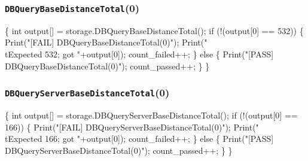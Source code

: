 \documentclass{article}
\def\nwendcode{\endtrivlist \endgroup}
\let\nwdocspar=\par
\begin{document}
\subsubsection{{\tt{}DBQueryBaseDistanceTotal}(0)}
\nwenddocs{}\endmoddef{}
\{
  int output[] = storage.DBQueryBaseDistanceTotal();
  if (!(output[0] == 532)) \{
    Print("[FAIL] DBQueryBaseDistanceTotal(0)");
    Print("\\tExpected 532; got "+output[0]);
    count_failed++;
  \} else \{
    Print("[PASS] DBQueryBaseDistanceTotal(0)");
    count_passed++;
  \}
\}
\nwendcode{}\nwdocspar
\subsubsection{{\tt{}DBQueryServerBaseDistanceTotal}(0)}
\nwenddocs{}\endmoddef{}
\{
  int output[] = storage.DBQueryServerBaseDistanceTotal();
  if (!(output[0] == 166)) \{
    Print("[FAIL] DBQueryServerBaseDistanceTotal(0)");
    Print("\\tExpected 166; got "+output[0]);
    count_failed++;
  \} else \{
    Print("[PASS] DBQueryServerBaseDistanceTotal(0)");
    count_passed++;
  \}
\}
\nwendcode{}\nwdocspar
\end{document}
